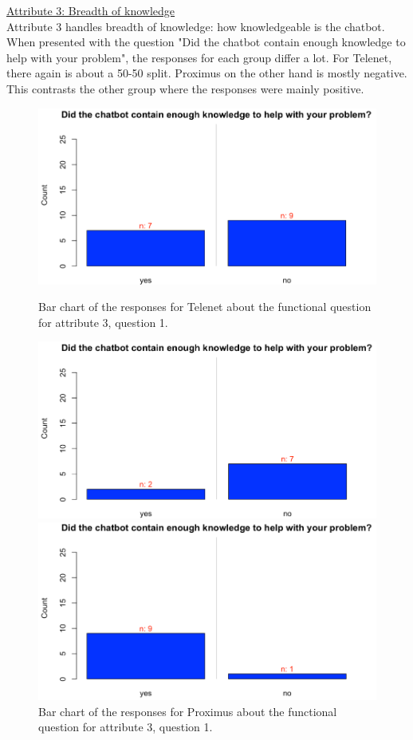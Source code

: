 \break
\ul{Attribute 3: Breadth of knowledge}\\
\break
Attribute 3 handles breadth of knowledge: how knowledgeable is the chatbot. When presented with the question "Did the chatbot contain enough knowledge to help with your problem", the responses for each group differ a lot. For Telenet, there again is about a 50-50 split. Proximus on the other hand is mostly negative. This contrasts the other group where the responses were mainly positive.\\
\begin{figure}[!htb]
	\includegraphics[width=\linewidth]{../LaTeX/Figures/Comparative/Q3T.png}
	\caption{Bar chart of the responses for Telenet about the functional question for attribute 3, question 1.}\label{fig:Q3T}
	\endminipage\hfill
	\includegraphics[width=\linewidth]{../LaTeX/Figures/Comparative/Q3P.png}
	\caption{Bar chart of the responses for Proximus about the functional question for attribute 3, question 1.}\label{fig:Q3P}
	\endminipage\hfill
	\includegraphics[width=\linewidth]{../LaTeX/Figures/Comparative/Q3O.png}

\end{figure}
